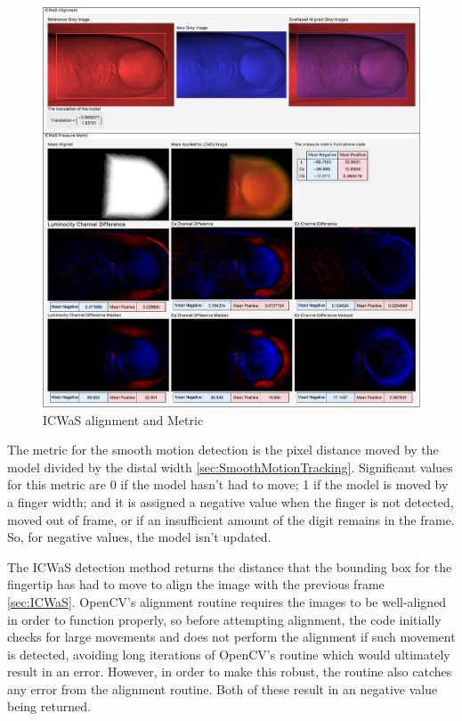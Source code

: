\begin{figure}[tbph]
\centering
\includegraphics[width=0.95\linewidth]{Chapter4/Figs/ICWaSAlignment&Metric}
\caption{ICWaS alignment and Metric}
\label{fig:icwasalignmentmetric}
\end{figure}

The metric for the smooth motion detection is the pixel distance moved by the model divided by the distal width \ref{sec:SmoothMotionTracking}. Significant values for this metric are 0 if the model hasn't had to move; 1 if the model is moved by a finger width; and it is assigned a negative value when the finger is not detected, moved out of frame, or if an insufficient amount of the digit remains in the frame. So, for negative values, the model isn't updated.

The ICWaS detection method returns the distance that the bounding box for the fingertip has had to move to align the image with the previous frame \ref{sec:ICWaS}. OpenCV's alignment routine requires the images to be well-aligned in order to function properly, so before attempting alignment, the code initially checks for large movements and does not perform the alignment if such movement is detected, avoiding long iterations of OpenCV's routine which would ultimately result in an error. However, in order to make this robust, the routine also catches any error from the alignment routine. Both of these result in an negative value being returned.

